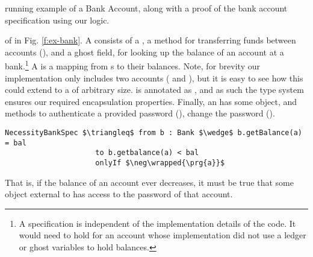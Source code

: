 running example of a Bank Account, along with a proof 
of the bank account specification using our \Nec logic.


 of  in Fig. \ref{f:ex-bank}.
A  consists of a , a method for transferring 
funds between accounts (), and a ghost field, 
for looking up the balance of an account at a bank.\footnote{A \Nec specification is independent of the implementation details of the code. It would need to hold for an account whose implementation did not use a ledger or ghost variables to hold balances.}
A  is
a mapping from s to their balances. Note, for brevity
our implementation only includes two accounts ( and ),
but it is easy to see how this could extend to a 
of arbitrary size.  is annotated as \enclosed, and as 
such the type system ensures our required encapsulation properties.
Finally, an  has some  object, and 
methods to authenticate a provided password (), 
change the password ().
\begin{lstlisting}[language = Chainmail, mathescape=true, frame=lines]
NecessityBankSpec $\triangleq$ from b : Bank $\wedge$ b.getBalance(a) = bal 
                     to b.getbalance(a) < bal
                     onlyIf $\neg\wrapped{\prg{a}}$
\end{lstlisting}
That is, if the balance of an account ever decreases, it must be true that some object external to
 has access to the password of that account. 

